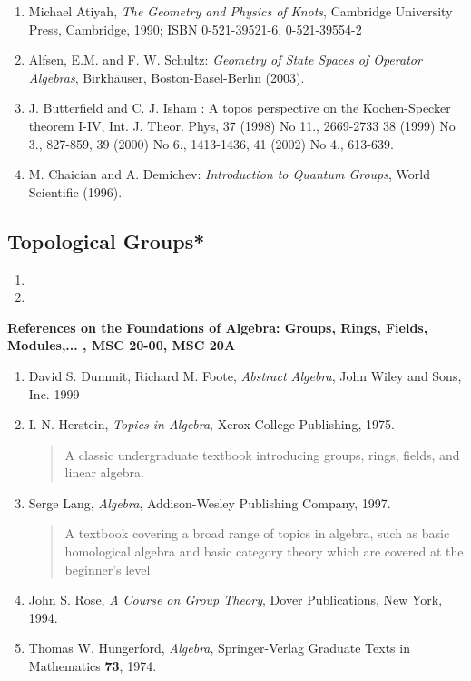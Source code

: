 \documentclass[12pt]{article}
\theoremstyle{plain}
\theoremstyle{definition}
\numberwithin{equation}{section}
\begin{document}
\begin{enumerate}
\item Michael Atiyah, \emph{The Geometry and Physics of Knots}, Cambridge University Press, Cambridge, 1990; ISBN 0-521-39521-6, 0-521-39554-2
\item Alfsen, E.M. and F. W. Schultz: \emph{Geometry of State Spaces of
Operator Algebras}, Birkh\"auser, Boston-Basel-Berlin (2003).
\item J. Butterfield and C. J. Isham : A topos perspective on the Kochen-Specker theorem I-IV, Int. J. Theor. Phys, 37 (1998) No 11., 2669-2733 38 (1999) No 3., 827-859, 39 (2000) No 6., 1413-1436, 41 (2002) No 4., 613-639.
\item M. Chaician and A. Demichev: \emph{Introduction to Quantum Groups}, World Scientific (1996).
\end{enumerate}

\subsection{Topological Groups*}

\begin{enumerate}
\item {}
\item {}
\end{enumerate}




{\bf References on the Foundations of Algebra: Groups, Rings, Fields, Modules,... , MSC 20-00, MSC 20A}

\begin{enumerate}
\item David S. Dummit, Richard M. Foote, \emph{Abstract Algebra}, John Wiley and Sons, Inc. 1999
\item I. N. Herstein, \emph{Topics in Algebra}, Xerox College Publishing, 1975.
\begin{quote} A classic undergraduate textbook introducing groups, rings, fields, and linear algebra.
\end{quote}  
\item Serge Lang, \emph{Algebra}, Addison-Wesley Publishing Company, 1997. 
\begin{quote}A textbook covering a broad range of topics in algebra, such as basic homological algebra and basic category theory which are covered at the beginner's level.
\end{quote}  
\item John S. Rose, \emph{A Course on Group Theory}, Dover Publications, New York, 1994.
\item Thomas W. Hungerford, \emph{Algebra}, Springer-Verlag Graduate Texts in Mathematics {\bf 73}, 1974.  
\end{enumerate}
\end{document}
